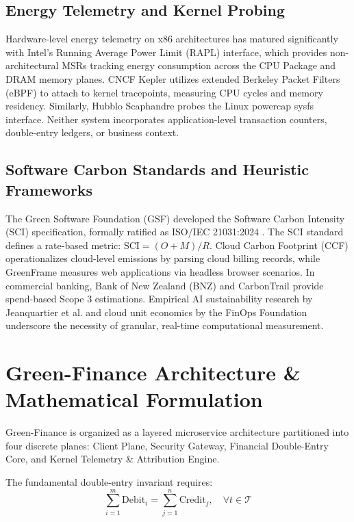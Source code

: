 \documentclass[conference]{IEEEtran}
\begin{document}
\subsection{Energy Telemetry and Kernel Probing}
Hardware-level energy telemetry on x86 architectures has matured significantly with Intel's Running Average Power Limit (RAPL) interface, which provides non-architectural MSRs tracking energy consumption across the CPU Package and DRAM memory planes. CNCF Kepler \cite{kepler2024} utilizes extended Berkeley Packet Filters (eBPF) to attach to kernel tracepoints, measuring CPU cycles and memory residency. Similarly, Hubblo Scaphandre \cite{scaphandre2024} probes the Linux powercap sysfs interface. Neither system incorporates application-level transaction counters, double-entry ledgers, or business context.

\subsection{Software Carbon Standards and Heuristic Frameworks}
The Green Software Foundation (GSF) developed the Software Carbon Intensity (SCI) specification, formally ratified as ISO/IEC 21031:2024 \cite{iso21031}. The SCI standard defines a rate-based metric: $\text{SCI} = (O + M) / R$. Cloud Carbon Footprint (CCF) \cite{ccf2024} operationalizes cloud-level emissions by parsing cloud billing records, while GreenFrame \cite{greenframe2024} measures web applications via headless browser scenarios. In commercial banking, Bank of New Zealand (BNZ) \cite{bnz2024} and CarbonTrail \cite{carbontrail2026} provide spend-based Scope 3 estimations. Empirical AI sustainability research by Jeanquartier et al. \cite{jeanquartier2026} and cloud unit economics by the FinOps Foundation \cite{finops2024} underscore the necessity of granular, real-time computational measurement.

\section{Green-Finance Architecture \& Mathematical Formulation}
Green-Finance is organized as a layered microservice architecture partitioned into four discrete planes: Client Plane, Security Gateway, Financial Double-Entry Core, and Kernel Telemetry \& Attribution Engine.

The fundamental double-entry invariant requires:
\begin{equation}
\sum_{i=1}^m \text{Debit}_i = \sum_{j=1}^n \text{Credit}_j , \quad \forall t \in \mathcal{T}
\end{equation}
\end{document}
